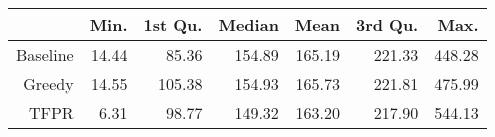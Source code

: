 \begin{table}[ht]
\centering
\begin{tabular}{rrrrrrr}
  \hline
 & Min. & 1st Qu. & Median & Mean & 3rd Qu. & Max. \\ 
  \hline
Baseline & 14.44 & 85.36 & 154.89 & 165.19 & 221.33 & 448.28 \\ 
  Greedy & 14.55 & 105.38 & 154.93 & 165.73 & 221.81 & 475.99 \\ 
  TFPR & 6.31 & 98.77 & 149.32 & 163.20 & 217.90 & 544.13 \\ 
   \hline
\end{tabular}
\end{table}
